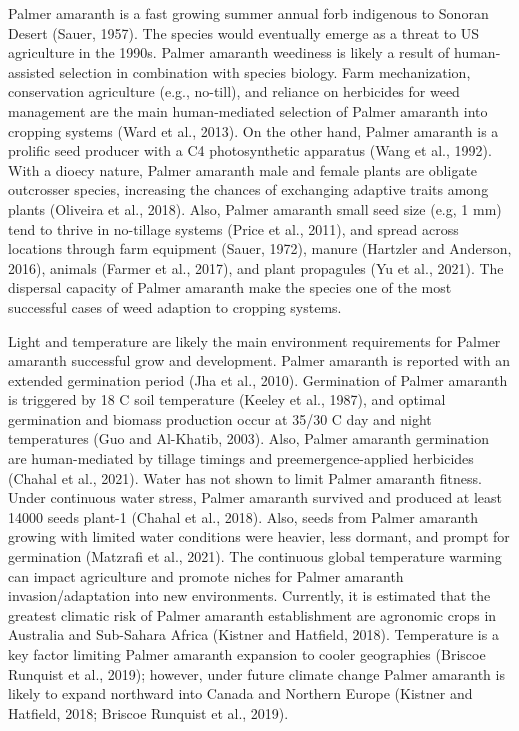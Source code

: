 \documentclass[utf8]{frontiersSCNS}
\begin{document}
Palmer amaranth is a fast growing summer annual forb indigenous to
Sonoran Desert (Sauer, 1957). The species would eventually emerge as a
threat to US agriculture in the 1990s. Palmer amaranth weediness is
likely a result of human-assisted selection in combination with species
biology. Farm mechanization, conservation agriculture (e.g., no-till),
and reliance on herbicides for weed management are the main
human-mediated selection of Palmer amaranth into cropping systems (Ward
et al., 2013). On the other hand, Palmer amaranth is a prolific seed
producer with a C4 photosynthetic apparatus (Wang et al., 1992). With a
dioecy nature, Palmer amaranth male and female plants are obligate
outcrosser species, increasing the chances of exchanging adaptive traits
among plants (Oliveira et al., 2018). Also, Palmer amaranth small seed
size (e.g, 1 mm) tend to thrive in no-tillage systems (Price et al.,
2011), and spread across locations through farm equipment (Sauer, 1972),
manure (Hartzler and Anderson, 2016), animals (Farmer et al., 2017), and
plant propagules (Yu et al., 2021). The dispersal capacity of Palmer
amaranth make the species one of the most successful cases of weed
adaption to cropping systems.

Light and temperature are likely the main environment requirements for
Palmer amaranth successful grow and development. Palmer amaranth is
reported with an extended germination period (Jha et al., 2010).
Germination of Palmer amaranth is triggered by 18 C soil temperature
(Keeley et al., 1987), and optimal germination and biomass production
occur at 35/30 C day and night temperatures (Guo and Al-Khatib, 2003).
Also, Palmer amaranth germination are human-mediated by tillage timings
and preemergence-applied herbicides (Chahal et al., 2021). Water has not
shown to limit Palmer amaranth fitness. Under continuous water stress,
Palmer amaranth survived and produced at least 14000 seeds plant-1
(Chahal et al., 2018). Also, seeds from Palmer amaranth growing with
limited water conditions were heavier, less dormant, and prompt for
germination (Matzrafi et al., 2021). The continuous global temperature
warming can impact agriculture and promote niches for Palmer amaranth
invasion/adaptation into new environments. Currently, it is estimated
that the greatest climatic risk of Palmer amaranth establishment are
agronomic crops in Australia and Sub-Sahara Africa (Kistner and
Hatfield, 2018). Temperature is a key factor limiting Palmer amaranth
expansion to cooler geographies (Briscoe Runquist et al., 2019);
however, under future climate change Palmer amaranth is likely to expand
northward into Canada and Northern Europe (Kistner and Hatfield, 2018;
Briscoe Runquist et al., 2019).
\end{document}
